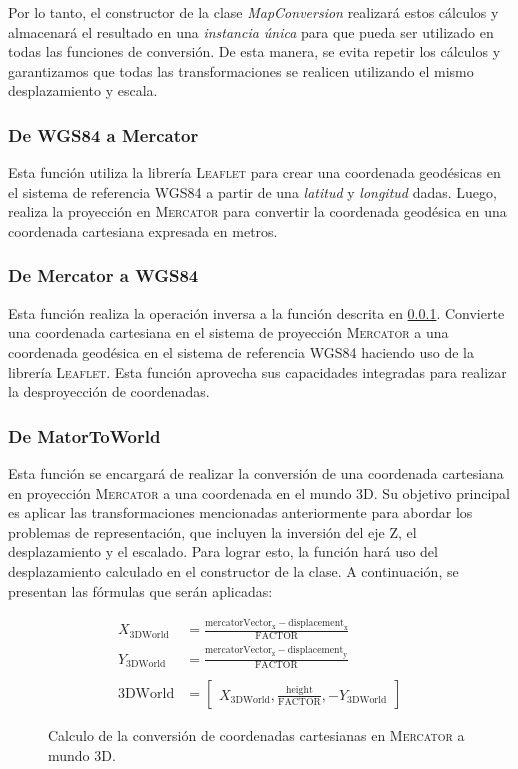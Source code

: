 \documentclass[a4paper, 11pt]{book}
\begin{document}
Por lo tanto, el constructor de la clase \emph{MapConversion} realizará estos cálculos y almacenará el resultado en una \emph{instancia única} para que pueda ser utilizado en todas las funciones de conversión. De esta manera, se evita repetir los cálculos y garantizamos que todas las transformaciones se realicen utilizando el mismo desplazamiento y escala.
\subsubsection{De WGS84 a Mercator}
\label{funcion:deegreeToMeter}
Esta función utiliza la librería \textsc{Leaflet} para crear una coordenada geodésicas en el sistema de referencia \textsc{WGS84} a partir de una \emph{latitud} y \emph{longitud} dadas. Luego, realiza la proyección en \textsc{Mercator} para convertir la coordenada geodésica en una coordenada cartesiana expresada en metros.
\subsubsection{De Mercator a WGS84}
\label{funcion:meterToDegree}
Esta función realiza la operación inversa a la función descrita en \ref{funcion:deegreeToMeter}. Convierte una coordenada cartesiana en el sistema de proyección \textsc{Mercator} a una coordenada geodésica en el sistema de referencia \textsc{WGS84} haciendo uso de la librería \textsc{Leaflet}. Esta función aprovecha sus capacidades integradas para realizar la desproyección de coordenadas.
\subsubsection{De MatorToWorld}
Esta función se encargará de realizar la conversión de una coordenada cartesiana en proyección \textsc{Mercator} a una coordenada en el mundo 3D. Su objetivo principal es aplicar las transformaciones mencionadas anteriormente para abordar los problemas de representación, que incluyen la inversión del eje \textsc{Z}, el desplazamiento y el escalado. Para lograr esto, la función hará uso del desplazamiento calculado en el constructor de la clase. A continuación, se presentan las fórmulas que serán aplicadas:

\begin{figure}[h]
    \begin{align*}
    X_{\text{3DWorld}} &= \frac{\mathbf{\mathrm{mercatorVector}}_{\text{x}} - \mathbf{\mathrm{displacement}}_{\text{x}}}{\mathbf{\mathrm{FACTOR}}} \\
    Y_{\text{3DWorld}} &= \frac{\mathbf{\mathrm{mercatorVector}}_{\text{z}} - \mathbf{\mathrm{displacement}}_{\text{y}}}{\mathbf{\mathrm{FACTOR}}} \\\\
    \mathbf{\mathrm{3DWorld}} &= 
    \begin{bmatrix}
    X_{\text{3DWorld}}, \frac{\mathrm{height}}{\mathbf{\mathrm{FACTOR}}}, -Y_{\text{3DWorld}}
    \end{bmatrix}
    \end{align*}
\caption{Calculo de la conversión de coordenadas cartesianas en \textsc{Mercator} a mundo \textsc{3D}.}
  \label{formula:mercatorToWorld}
\end{figure}
\end{document}
